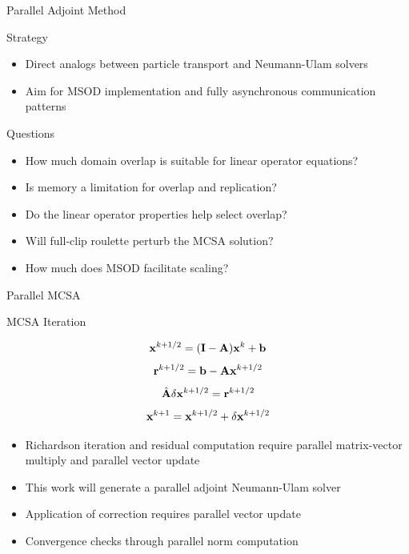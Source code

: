 \documentclass{beamer}
\begin{document}
\begin{frame}{Parallel Adjoint Method}

Strategy
  \begin{itemize}
  \item Direct analogs between particle transport and Neumann-Ulam
    solvers 
  \item Aim for MSOD implementation and fully asynchronous
    communication patterns
  \end{itemize}

  \medskip \medskip \medskip
Questions
  \begin{itemize}
  \item How much domain overlap is suitable for linear operator
    equations? 
  \item Is memory a limitation for overlap and replication?
  \item Do the linear operator properties help select overlap?
  \item Will full-clip roulette perturb the MCSA solution?
  \item How much does MSOD facilitate scaling?
  \end{itemize}

\end{frame}

\begin{frame}{Parallel MCSA}

  \begin{beamerboxesrounded}[upper=boxheadcolor,lower=boxbodycolor,shadow=true]
    {MCSA Iteration}

    \[
    \mathbf{x}^{k+1/2} = (\mathbf{I} - \mathbf{A})\mathbf{x}^k + \mathbf{b}
    \]
    \[
    \mathbf{r}^{k+1/2} = \mathbf{b} - \mathbf{A}\mathbf{x}^{k+1/2}
    \]
    \[
    \hat{\mathbf{A}}\delta\mathbf{x}^{k+1/2} = \mathbf{r}^{k+1/2}
    \]
    \[
    \mathbf{x}^{k+1} = \mathbf{x}^{k+1/2} + \delta \mathbf{x}^{k+1/2}
    \]

  \end{beamerboxesrounded}

  \medskip \medskip
  \begin{itemize}
  \item Richardson iteration and residual computation require parallel
    matrix-vector multiply and parallel vector update
  \item This work will generate a parallel adjoint Neumann-Ulam solver
  \item Application of correction requires parallel vector update
  \item Convergence checks through parallel norm computation
  \end{itemize}

\end{frame}
\end{document}
